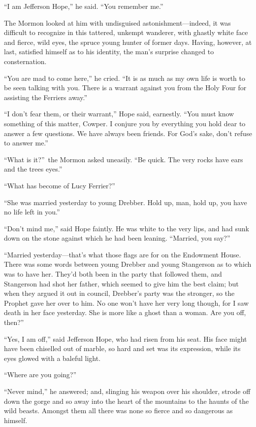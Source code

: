\documentclass[12pt,english,oneside]{book}
\newcommand{\mdsh}[1]{\mbox{#1}\linebreak[1]}
\begin{document}
{}``I am Jefferson Hope,'' he said. {}``You remember me.''

The Mormon looked at him with undisguised astonishment\mdsh{---}indeed,
it was difficult to recognize in this tattered, unkempt wanderer,
with ghastly white face and fierce, wild eyes, the spruce young hunter
of former days. Having, however, at last, satisfied himself as to
his identity, the man's surprise changed to consternation.

{}``You are mad to come here,'' he cried. {}``It is as much as
my own life is worth to be seen talking with you. There is a warrant
against you from the Holy Four for assisting the Ferriers away.''

{}``I don't fear them, or their warrant,'' Hope said, earnestly.
{}``You must know something of this matter, Cowper. I conjure you
by everything you hold dear to answer a few questions. We have always
been friends. For God's sake, don't refuse to answer me.''

{}``What is it?''\ the Mormon asked uneasily. {}``Be quick. The
very rocks have ears and the trees eyes.''

{}``What has become of Lucy Ferrier?''

{}``She was married yesterday to young Drebber. Hold up, man, hold
up, you have no life left in you.''

{}``Don't mind me,'' said Hope faintly. He was white to the very
lips, and had sunk down on the stone against which he had been leaning.
{}``Married, you say?''

{}``Married yesterday\mdsh{---}that's what those flags are for on
the Endowment House. There was some words between young Drebber and
young Stangerson as to which was to have her. They'd both been in
the party that followed them, and Stangerson had shot her father,
which seemed to give him the best claim; but when they argued it out
in council, Drebber's party was the stronger, so the Prophet gave
her over to him. No one won't have her very long though, for I saw
death in her face yesterday. She is more like a ghost than a woman.
Are you off, then?''

{}``Yes, I am off,'' said Jefferson Hope, who had risen from his
seat. His face might have been chiselled out of marble, so hard and
set was its expression, while its eyes glowed with a baleful light.

{}``Where are you going?''

{}``Never mind,'' he answered; and, slinging his weapon over his
shoulder, strode off down the gorge and so away into the heart of
the mountains to the haunts of the wild beasts. Amongst them all there
was none so fierce and so dangerous as himself.
\end{document}
